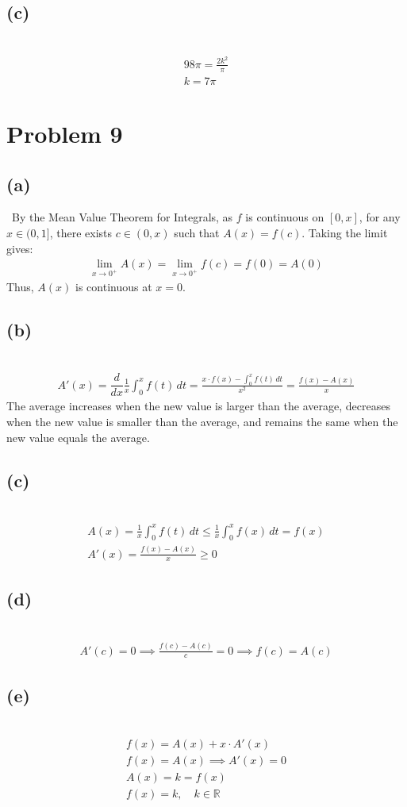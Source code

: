 \documentclass[12pt]{article}
\newcommand{\ddx}{\dfrac{d}{dx}}
\newcommand{\vem}{\vspace{0.5em}}
\newcommand{\problem}[1]{\section{Problem #1}}
\newcommand{\subproblem}[1]{\subsection{(#1)} \,}
\begin{document}
\subproblem{c}
\begin{gather*}
    98\pi = \frac{2k^2}{\pi}\\
    k=\boxed{7\pi}
\end{gather*}

\problem{9}

\subproblem{a}
By the Mean Value Theorem for Integrals, as $f$ is continuous on $[0,x]$, for any $x\in (0,1]$, there exists $c\in (0,x)$ such that $A(x)=f(c)$. Taking the limit gives:
\begin{gather*}
    \lim_{x \to 0^+} A(x)=\lim_{x \to 0^+}f(c)=f(0)=A(0)
\end{gather*}
Thus, $A(x)$ is continuous at $x=0$.\vem

\subproblem{b}
\begin{gather*}
    A'(x)=\ddx \frac{1}{x}\int_0^xf(t)\, dt = \frac{x\cdot f(x)-\int_0^x f(t)\, dt}{x^2}=\boxed{\frac{f(x)-A(x)}{x}}
\end{gather*}
The average increases when the new value is larger than the average, decreases when the new value is smaller than the average, and remains the same when the new value equals the average.\vem

\subproblem{c}
\begin{gather*}
    A(x)=\frac{1}{x}\int_0^xf(t)\, dt\le \frac{1}{x}\int_0^x f(x)\, dt=f(x)\\
    A'(x)=\frac{f(x)-A(x)}{x}\ge 0
\end{gather*}

\subproblem{d}
\begin{gather*}
    A'(c)=0 \implies \frac{f(c)-A(c)}{c}=0 \implies \boxed{f(c)=A(c)}
\end{gather*}

\subproblem{e}
\begin{gather*}
    f(x)=A(x)+x\cdot A'(x)\\
    f(x)=A(x)\implies A'(x)=0\\
    A(x)=k=f(x)\\
    \boxed{f(x)=k,\quad k\in \mathbb{R}}
\end{gather*}
\end{document}
